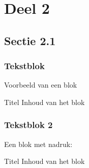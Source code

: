 \documentclass{beamer}
\begin{document}
\section{Deel 2}

\subsection{Sectie 2.1}

\begin{frame}
  \frametitle{Tekstblok}

  Voorbeeld van een \alert{blok}

  \begin{block}{Titel}
    Inhoud van het \alert{blok}
  \end{block}

\end{frame}


\begin{frame}
  \frametitle{Tekstblok 2}

  Een blok met nadruk:

  \begin{alertblock}{Titel}
    Inhoud van het blok
  \end{alertblock}

\end{frame}

\end{document}
